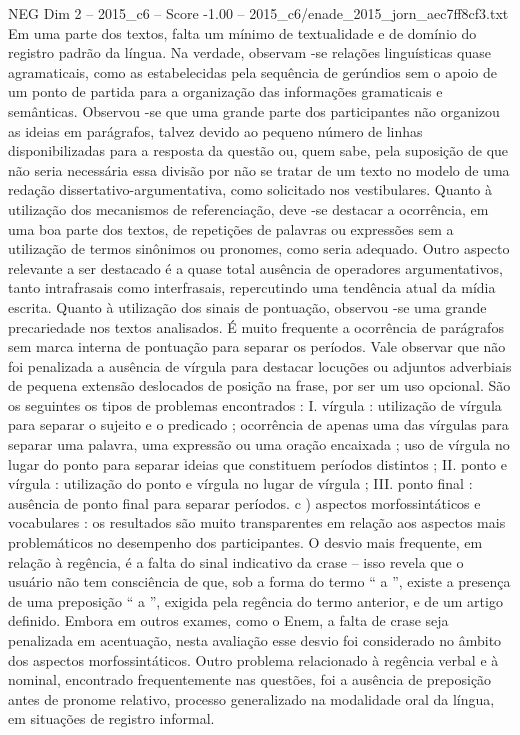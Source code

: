 \begin{textsample}{NEG Dim 2 – 2015\_c6 – Score -1.00 – 2015\_c6/enade\_2015\_jorn\_aec7ff8cf3.txt}
Em uma parte dos textos, falta um mínimo de textualidade e de domínio do registro padrão da língua.
Na verdade, observam -se relações linguísticas quase agramaticais, como as estabelecidas pela sequência de gerúndios sem o apoio de um ponto de partida para a organização das informações gramaticais e semânticas.
Observou -se que uma grande parte dos participantes não organizou as ideias em parágrafos, talvez devido ao pequeno número de linhas disponibilizadas para a resposta da questão ou, quem sabe, pela suposição de que não seria necessária essa divisão por não se tratar de um texto no modelo de uma redação dissertativo-argumentativa, como solicitado nos vestibulares.
Quanto à utilização dos mecanismos de referenciação, deve -se destacar a ocorrência, em uma boa parte dos textos, de repetições de palavras ou expressões sem a utilização de termos sinônimos ou pronomes, como seria adequado.
Outro aspecto relevante a ser destacado é a quase total ausência de operadores argumentativos, tanto intrafrasais como interfrasais, repercutindo uma tendência atual da mídia escrita.
Quanto à utilização dos sinais de pontuação, observou -se uma grande precariedade nos textos analisados.
É muito frequente a ocorrência de parágrafos sem marca interna de pontuação para separar os períodos.
Vale observar que não foi penalizada a ausência de vírgula para destacar locuções ou adjuntos adverbiais de pequena extensão deslocados de posição na frase, por ser um uso opcional.
São os seguintes os tipos de problemas encontrados : I. vírgula : utilização de vírgula para separar o sujeito e o predicado ; ocorrência de apenas uma das vírgulas para separar uma palavra, uma expressão ou uma oração encaixada ; uso de vírgula no lugar do ponto para separar ideias que constituem períodos distintos ; II. ponto e vírgula : utilização do ponto e vírgula no lugar de vírgula ; III. ponto final : ausência de ponto final para separar períodos. c ) aspectos morfossintáticos e vocabulares : os resultados são muito transparentes em relação aos aspectos mais problemáticos no desempenho dos participantes.
O desvio mais frequente, em relação à regência, é a falta do sinal indicativo da crase – isso revela que o usuário não tem consciência de que, sob a forma do termo “ a ”, existe a presença de uma preposição “ a ”, exigida pela regência do termo anterior, e de um artigo definido.
Embora em outros exames, como o Enem, a falta de crase seja penalizada em acentuação, nesta avaliação esse desvio foi considerado no âmbito dos aspectos morfossintáticos.
Outro problema relacionado à regência verbal e à nominal, encontrado frequentemente nas questões, foi a ausência de preposição antes de pronome relativo, processo generalizado na modalidade oral da língua, em situações de registro informal.

\end{textsample}
